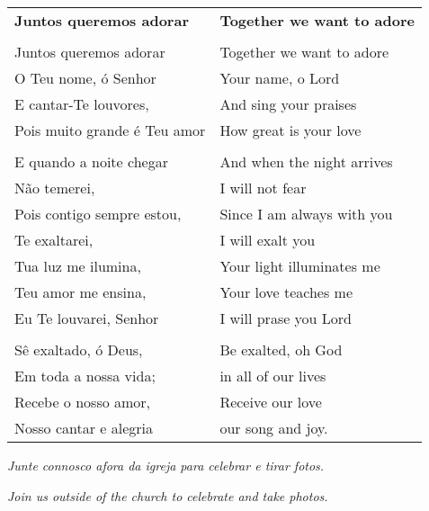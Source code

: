 \begin{longtable}{L{1.7in}R{1.7in}}
  {\bf Juntos queremos adorar}& {\bf Together we want to adore}\\
                        &\\
  Juntos queremos adorar& Together we want to adore\\
  O Teu nome, ó Senhor& Your name, o Lord\\
  E cantar-Te louvores, & And sing your praises\\
  Pois muito grande é Teu amor & How great is your love\\
                                &\\
  E quando a noite chegar & And when the night arrives\\
  Não temerei,  & I will not fear\\
  Pois contigo sempre estou, & Since I am always with you\\
  Te exaltarei, & I will exalt you \\
  Tua luz me ilumina, & Your light illuminates me\\
  Teu amor me ensina, & Your love teaches me \\
  Eu Te louvarei, Senhor & I will prase you Lord\\
                         &\\
  Sê exaltado, ó Deus, & Be exalted, oh God\\
  Em toda a nossa vida; & in all of our lives\\
  Recebe o nosso amor, & Receive our love \\
  Nosso cantar e alegria & our song and joy. \\
\end{longtable}


{\it Junte connosco afora da igreja para celebrar e tirar fotos.}

{\it Join us outside of the church to celebrate and take photos.}
